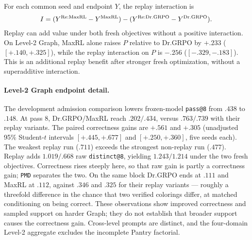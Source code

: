 \documentclass{article}
\newcommand{\1}{\mathbf 1}
\newcommand{\pmd}{\texttt{PMD}}
\theoremstyle{remark}
\theoremstyle{definition}
\theoremstyle{plain}
\begin{document}
For each common seed and endpoint $Y$, the replay interaction is
\[
 I=(Y^{\rm Re:MaxRL}-Y^{\rm MaxRL})
    -(Y^{\rm Re:Dr.GRPO}-Y^{\rm Dr.GRPO}).
\]
Replay can add value under both fresh objectives without a positive
interaction. On Level-2 Graph, MaxRL alone raises $P$ relative to Dr.GRPO
by $+.233$ ($[+.140,+.325]$), while the replay interaction on $P$ is
$-.256$ ($[-.329,-.183]$). This is an additional replay benefit after
stronger fresh optimization, without a superadditive interaction.

\begin{table}[H]
  \centering
  \caption{\textbf{Fresh-objective effects and replay interactions on Level 2.}
  All three contrasts within a domain use the same four-arm seed
  intersection. The interaction is
  $(\mathrm{Re:MaxRL}-\mathrm{MaxRL})-
  (\mathrm{Re:Dr.GRPO}-\mathrm{Dr.GRPO})$.
  Each entry gives its mean and, only for a complete five-seed block, a
  paired unadjusted 95\% Student-$t$ interval. Archived four-arm exports:
  \href{https://huggingface.co/od2961/maxent-grpo-models/blob/main/experiments/E119/README.md\#models}{E119 model index}.}
  \label{tab:level2-factorial-contrasts}
  \scriptsize
  \setlength{\tabcolsep}{3pt}
\end{table}


\paragraph{Level-2 Graph endpoint detail.}
\label{app:levels-numerical-detail}
The development admission comparison lowers frozen-model \texttt{pass@8} from $.438$
to $.148$. At pass 8, Dr.GRPO/MaxRL reach $.202/.434$, versus $.763/.739$
with their replay variants. The paired correctness gains are $+.561$ and
$+.305$ (unadjusted 95\% Student-$t$ intervals $[+.445,+.677]$ and
$[+.250,+.360]$, five seeds each). The weakest replay run ($.711$) exceeds
the strongest non-replay run ($.477$). Replay adds $1.019/.668$ raw
\texttt{distinct@8}, yielding $1.243/1.214$ under the two fresh objectives.
Correctness rises steeply here, so that raw gain is partly a correctness gain;
\pmd{} separates the two. On the same block Dr.GRPO ends at $.111$ and MaxRL at
$.112$, against $.346$ and $.325$ for their replay variants --- roughly a
threefold difference in the chance that two verified colorings differ, at
matched conditioning on being correct.
These observations show improved correctness and sampled support on harder
Graph; they do not establish that broader support causes the correctness
gain. Cross-level prompts are distinct, and the four-domain Level-2
aggregate excludes the incomplete Pantry factorial.
\end{document}
